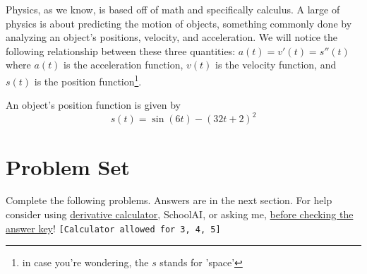 \documentclass[addpoints]{exam}
\theoremstyle{definition}
\theoremstyle{plain}
\begin{document}
\begin{tcolorbox}[breakable, title=\subsection{APPLICATION: PHYSICS}, colframe=black, sharp corners, colback=Azure4!30, colbacktitle=DarkOrchid2!60, coltitle=black]
    Physics, as we know, is based off of math and specifically calculus. A large of physics is about predicting the motion of objects, something commonly done by analyzing an object's positions, velocity, and acceleration. We will notice the following relationship between these three quantities: $a(t) = v'(t) = s''(t)$ where $a(t)$ is the acceleration function, $v(t)$ is the velocity function, and $s(t)$ is the position function\footnote{in case you're wondering, the $s$ stands for 'space'}.
\end{tcolorbox}
\begin{questions}
    \question An object's position function is given by \[ s(t) = \sin\left(6t\right) - \left(32t + 2\right)^2\]
\end{questions}

\newpage 

\section{Problem Set}
Complete the following problems. Answers are in the next section. For help consider using \href{https://derivative-calculator.net}{\underline{derivative calculator}}, SchoolAI, or asking me, \underline{before checking the answer key}! {\texttt{[Calculator allowed for 3, 4, 5]}}
\end{document}
